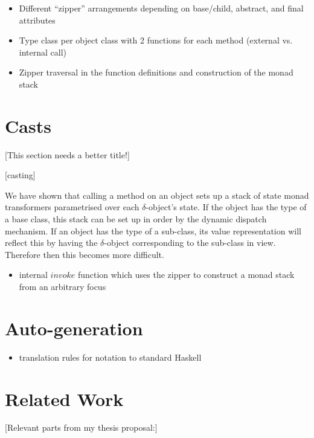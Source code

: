 \documentclass[runningheads,a4paper]{llncs}
\newcommand{\todo}[1]{[{\color{blue}#1}]}
\begin{document}
\begin{itemize}
\item Different ``zipper'' arrangements depending on base/child, abstract, and final attributes
\item Type class per object class with 2 functions for each method (external vs. internal call)
\item Zipper traversal in the function definitions and construction of the monad stack
\end{itemize}

\section{Casts}
\label{sec:casts}

\todo{This section needs a better title!}

\todo{casting}

We have shown that calling a method on an object sets up a stack of state monad transformers parametrised over each $\delta$-object's state. If the object has the type of a base class, this stack can be set up in order by the dynamic dispatch mechanism. If an object has the type of a sub-class, its value representation will reflect this by having the $\delta$-object corresponding to the sub-class in view. Therefore  then this becomes more difficult.



\begin{itemize}
\item internal $\mathit{invoke}$ function which uses the zipper to construct a monad stack from an arbitrary focus
\end{itemize}

\section{Auto-generation}
\label{sec:auto}

\begin{itemize}
\item translation rules for notation to standard Haskell
\end{itemize}

\section{Related Work}
\label{sec:related}

\todo{Relevant parts from my thesis proposal:}

\end{document}
